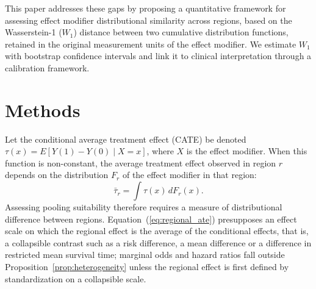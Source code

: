 \documentclass[AMA,Times1COL]{WileyNJDv5}
\begin{document}
This paper addresses these gaps by proposing a quantitative framework for assessing effect modifier distributional similarity across regions, based on the Wasserstein-1 ($W_1$) distance between two cumulative distribution functions, retained in the original measurement units of the effect modifier. We estimate $W_1$ with bootstrap confidence intervals and link it to clinical interpretation through a calibration framework.


\section{Methods}\label{sec:methods}

Let the conditional average treatment effect (CATE) be denoted $\tau(x) = E[Y(1) - Y(0) \mid X = x]$, where $X$ is the effect modifier. When this function is non-constant, the average treatment effect observed in region $r$ depends on the distribution $F_r$ of the effect modifier in that region:
\begin{equation}
\bar{\tau}_r = \int \tau(x) \, dF_r(x).
\label{eq:regional_ate}
\end{equation}
Assessing pooling suitability therefore requires a measure of distributional difference between regions. Equation~(\ref{eq:regional_ate}) presupposes an effect scale on which the regional effect is the average of the conditional effects, that is, a collapsible contrast such as a risk difference, a mean difference or a difference in restricted mean survival time; marginal odds and hazard ratios fall outside Proposition~\ref{prop:heterogeneity} unless the regional effect is first defined by standardization on a collapsible scale.
\end{document}
